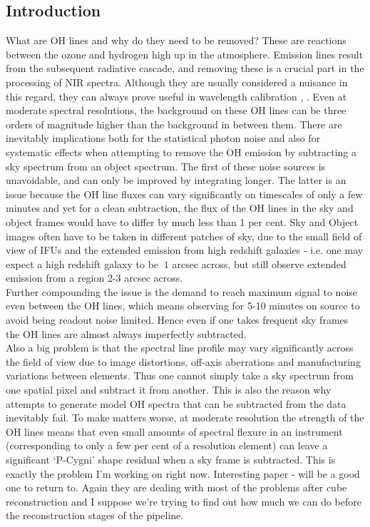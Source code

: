 \documentclass{literature}
\begin{document}
\subsection{Introduction}
What are OH lines and why do they need to be removed? These are reactions between the ozone and hydrogen high up in the atmosphere. Emission lines result from the subsequent radiative cascade, and removing these is a crucial part in the processing of NIR spectra. Although they are usually considered a nuisance in this regard, they can always prove useful in wavelength calibration \citep{Osterbrock1996}, \citep{Maihara1993}. Even at moderate spectral resolutions, the background on these OH lines can be three orders of magnitude higher than the background in between them. There are inevitably implications both for the statistical photon noise and also for systematic effects when attempting to remove the OH emission by subtracting a sky spectrum from an object spectrum. The first of these noise sources is unavoidable, and can only be improved by integrating longer. The latter is an issue because the OH line fluxes can vary significantly on timescales of only a few minutes and yet for a clean subtraction, the flux of the OH lines in the sky and object frames would have to differ by much less than 1 per cent. Sky and Object images often have to be taken in different patches of sky, due to the small field of view of IFUs and the extended emission from high redshift galaxies - i.e. one may expect a high redshift galaxy to be $~1$ arcsec across, but still observe extended emission from a region 2-3 arcsec across. \\ 
Further compounding the issue is the demand to reach maximum signal to noise even between the OH lines, which means observing for 5-10 minutes on source to avoid being readout noise limited. Hence even if one takes frequent sky frames the OH lines are almost always imperfectly subtracted.  \\ 
Also a big problem is that the spectral line profile may vary significantly across the field of view due to image distortions, off-axis aberrations and manufacturing variations between elements. Thus one cannot simply take a sky spectrum from one spatial pixel and subtract it from another. This is also the reason why attempts to generate model OH spectra that can be subtracted from the data inevitably fail. To make matters worse, at moderate resolution the strength of the OH lines means that even small amounts of spectral flexure in an instrument (corresponding to only a few per cent of a resolution element) can leave a significant `P-Cygni’ shape residual when a sky frame is subtracted. This is exactly the problem I'm working on right now. Interesting paper - will be a good one to return to. Again they are dealing with most of the problems after cube reconstruction and I suppose we're trying to find out how much we can do before the reconstruction stages of the pipeline. 
\end{document}
